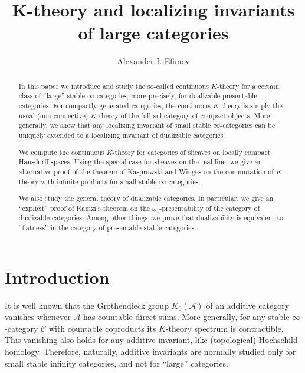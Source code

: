 \documentclass[11pt,leqno]{amsart}
\title[K-theory and localizing invariants of large categories]
{K-theory and localizing invariants of large categories}
\author{Alexander I. Efimov}
\numberwithin{equation}{section}
\newcommand{\cA}{{\mathcal A}}
\newcommand{\cC}{{\mathcal C}}
\begin{document}
\begin{abstract} In this paper we introduce and study the so-called continuous $K$-theory for a certain class of ``large'' stable $\infty$-categories, more precisely, for dualizable presentable categories. For compactly generated categories, the continuous $K$-theory is simply the usual (non-connective) $K$-theory of the full subcategory of compact objects. More generally, we show that any localizing invariant of small stable $\infty$-categories can be uniquely extended to a localizing invariant of dualizable categories.

We compute the continuous $K$-theory for categories of sheaves on locally compact Hausdorff spaces. Using the special case for sheaves on the real line, we give an alternative proof of the theorem of Kasprowski and Winges \cite{KW19} on the commutation of $K$-theory with infinite products for small stable $\infty$-categories.

We also study the general theory of dualizable categories. In particular, we give an ``explicit'' proof of Ramzi's theorem \cite{Ram24a} on the $\omega_1$-presentability of the category of dualizable categories. Among other things, we prove that dualizability is equivalent to ``flatness'' in the category of presentable stable categories.
\end{abstract}


\maketitle

\tableofcontents

\section{Introduction}

It is well known that the Grothendieck group $K_0(\cA)$ of an additive category vanishes whenever $\cA$ has countable direct sums. More generally, for any stable $\infty$-category $\cC$ with countable coproducts its $K$-theory spectrum is contractible. This vanishing also holds for any additive invariant, like (topological) Hochschild homology. Therefore, naturally, additive invariants are normally studied only for small stable infinity categories, and not for ``large'' categories. 
\end{document}

